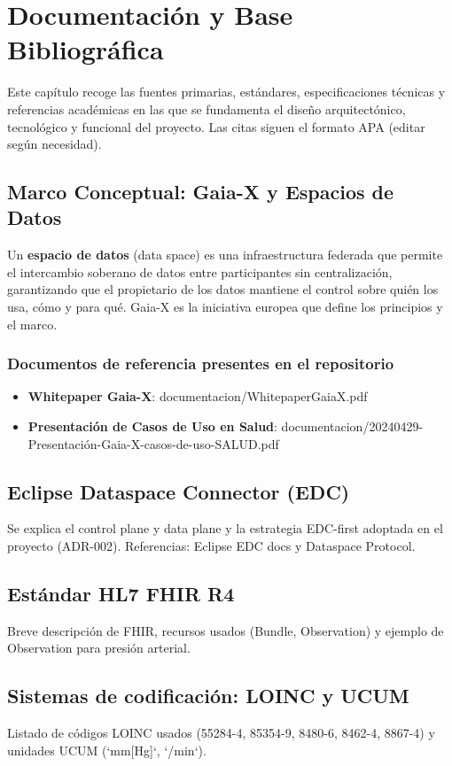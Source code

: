 \chapter{Documentación y Base Bibliográfica}
\label{ch:documentacion}

Este capítulo recoge las fuentes primarias, estándares, especificaciones técnicas y referencias académicas en las que se fundamenta el diseño arquitectónico, tecnológico y funcional del proyecto. Las citas siguen el formato APA (editar según necesidad).

\section{Marco Conceptual: Gaia-X y Espacios de Datos}
Un \textbf{espacio de datos} (data space) es una infraestructura federada que permite el intercambio soberano de datos entre participantes sin centralización, garantizando que el propietario de los datos mantiene el control sobre quién los usa, cómo y para qué. Gaia-X es la iniciativa europea que define los principios y el marco.

\subsection{Documentos de referencia presentes en el repositorio}
\begin{itemize}
  \item \textbf{Whitepaper Gaia-X}: documentacion/WhitepaperGaiaX.pdf
  \item \textbf{Presentación de Casos de Uso en Salud}: documentacion/20240429-Presentaci\'on-Gaia-X-casos-de-uso-SALUD.pdf
\end{itemize}

\section{Eclipse Dataspace Connector (EDC)}
Se explica el control plane y data plane y la estrategia EDC-first adoptada en el proyecto (ADR-002). Referencias: Eclipse EDC docs y Dataspace Protocol.

\section{Estándar HL7 FHIR R4}
Breve descripción de FHIR, recursos usados (Bundle, Observation) y ejemplo de Observation para presión arterial.

\section{Sistemas de codificación: LOINC y UCUM}
Listado de códigos LOINC usados (55284-4, 85354-9, 8480-6, 8462-4, 8867-4) y unidades UCUM (`mm[Hg]`, `/min`).

